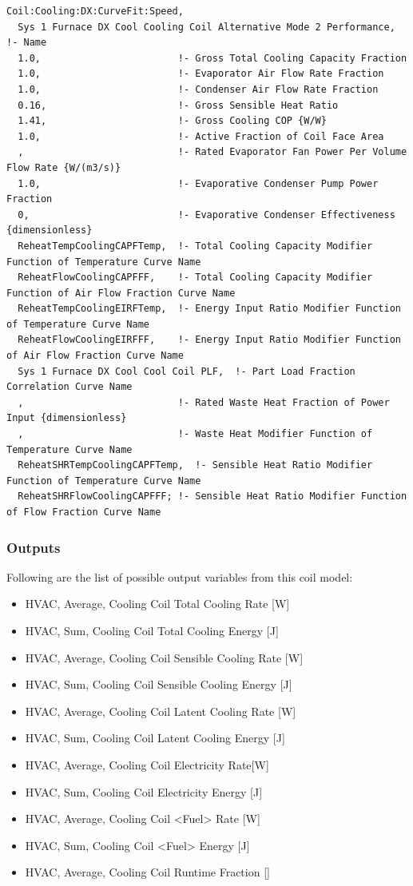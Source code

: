 \begin{lstlisting}
Coil:Cooling:DX:CurveFit:Speed,
  Sys 1 Furnace DX Cool Cooling Coil Alternative Mode 2 Performance,  !- Name
  1.0,                        !- Gross Total Cooling Capacity Fraction
  1.0,                        !- Evaporator Air Flow Rate Fraction
  1.0,                        !- Condenser Air Flow Rate Fraction
  0.16,                       !- Gross Sensible Heat Ratio
  1.41,                       !- Gross Cooling COP {W/W}
  1.0,                        !- Active Fraction of Coil Face Area
  ,                           !- Rated Evaporator Fan Power Per Volume Flow Rate {W/(m3/s)}
  1.0,                        !- Evaporative Condenser Pump Power Fraction
  0,                          !- Evaporative Condenser Effectiveness {dimensionless}
  ReheatTempCoolingCAPFTemp,  !- Total Cooling Capacity Modifier Function of Temperature Curve Name
  ReheatFlowCoolingCAPFFF,    !- Total Cooling Capacity Modifier Function of Air Flow Fraction Curve Name
  ReheatTempCoolingEIRFTemp,  !- Energy Input Ratio Modifier Function of Temperature Curve Name
  ReheatFlowCoolingEIRFFF,    !- Energy Input Ratio Modifier Function of Air Flow Fraction Curve Name
  Sys 1 Furnace DX Cool Cool Coil PLF,  !- Part Load Fraction Correlation Curve Name
  ,                           !- Rated Waste Heat Fraction of Power Input {dimensionless}
  ,                           !- Waste Heat Modifier Function of Temperature Curve Name
  ReheatSHRTempCoolingCAPFTemp,  !- Sensible Heat Ratio Modifier Function of Temperature Curve Name
  ReheatSHRFlowCoolingCAPFFF; !- Sensible Heat Ratio Modifier Function of Flow Fraction Curve Name
\end{lstlisting}


\subsubsection{Outputs}\label{outputs-01}

Following are the list of possible output variables from this coil model:

\begin{itemize}
\item HVAC, Average, Cooling Coil Total Cooling Rate {[}W{]}
\item HVAC, Sum, Cooling Coil Total Cooling Energy {[}J{]}
\item HVAC, Average, Cooling Coil Sensible Cooling Rate {[}W{]}
\item HVAC, Sum, Cooling Coil Sensible Cooling Energy {[}J{]}
\item HVAC, Average, Cooling Coil Latent Cooling Rate {[}W{]}
\item HVAC, Sum, Cooling Coil Latent Cooling Energy {[}J{]}
\item HVAC, Average, Cooling Coil Electricity Rate{[}W{]}
\item HVAC, Sum, Cooling Coil Electricity Energy {[}J{]}
\item HVAC, Average, Cooling Coil <Fuel> Rate {[}W{]}
\item HVAC, Sum, Cooling Coil <Fuel> Energy {[}J{]}
\item HVAC, Average, Cooling Coil Runtime Fraction {[]}
\end{itemize}

